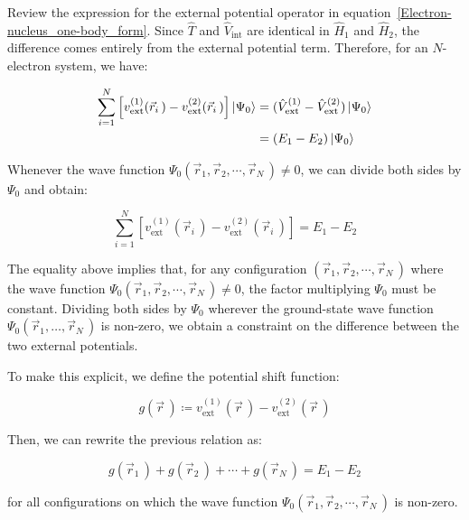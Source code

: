 Review the expression for the external potential operator in equation~\eqref{Electron-nucleus_one-body_form}.
Since $\hat{T}$ and $\hat{V}_\mathrm{int}$ are identical in $\hat{H}_1$ and $\hat{H}_2$, the difference comes entirely from the external potential term.
Therefore, for an $N$-electron system, we have:

\begin{equation}
\begin{aligned}
    \sum_{i=1}^N\left[v_\mathrm{ext}^{(1)}(\vec{r}_i\,)-v_\mathrm{ext}^{(2)}(\vec{r}_i\,)\right]\ket{\Psi_0}
    &= (\hat{V}_\mathrm{ext}^{(1)}-\hat{V}_\mathrm{ext}^{(2)})\ket{\Psi_0} \\
    &= (E_1-E_2)\ket{\Psi_0}
\end{aligned}
\label{energy_difference}
\end{equation}

Whenever the wave function $\Psi_0(\vec{r}_1,\vec{r}_2,\cdots,\vec{r}_N\,)\neq 0$, we can divide both sides by $\Psi_0$ and obtain:

\begin{equation}
    \sum_{i=1}^N\left[v_\mathrm{ext}^{(1)}(\vec{r}_i\,)-v_\mathrm{ext}^{(2)}(\vec{r}_i\,)\right]=E_1-E_2
\label{difference_energy_nowave}
\end{equation}

The equality above implies that, for any configuration $(\vec{r}_1,\vec{r}_2,\cdots,\vec{r}_N\,)$ where the wave function $\Psi_0(\vec{r}_1,\vec{r}_2,\cdots,\vec{r}_N\,)\neq 0$, the factor multiplying $\Psi_0$ must be constant.
Dividing both sides by $\Psi_0$ wherever the ground-state wave function $\Psi_0(\vec{r}_1,\ldots,\vec{r}_N\,)$ is non-zero, we obtain a constraint on the difference between the two external potentials.

To make this explicit, we define the potential shift function:

\begin{equation}
    g(\vec{r}\,)\coloneqq v_\mathrm{ext}^{(1)}(\vec{r}\,)-v_\mathrm{ext}^{(2)}(\vec{r}\,)
\label{shift_potential}
\end{equation}

Then, we can rewrite the previous relation as:

\begin{equation}
    g(\vec{r}_1\,)+g(\vec{r}_2\,)+\cdots+g(\vec{r}_N\,)=E_1-E_2
\label{N-body_shift_potential}
\end{equation}

for all configurations on which the wave function $\Psi_0(\vec{r}_1,\vec{r}_2,\cdots,\vec{r}_N\,)$ is non-zero.

